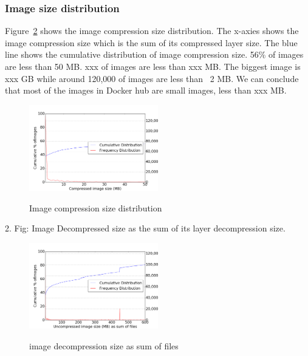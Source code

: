 \subsubsection{Image size distribution}

Figure~\ref{fig_image_size_compression} shows the image compression size distribution. The x-axies shows the image compression size which is the sum of its compressed layer size. The blue line shows the cumulative distribution of image compression size. 56\% of images are less than 50 MB. xxx of images are less than xxx MB. The biggest image is xxx GB while around 120,000 of images are less than ~2 MB. We can conclude that most of the images in Docker hub are small images, less than xxx MB.

\begin{figure}
	\centering
	\includegraphics[width=0.5\textwidth]{graphs/Compressed_image_size_(MB)}\\
	\caption{Image compression size distribution}\label{fig_image_size_compression}
\end{figure}

2. Fig: Image Decompressed size as the sum of its layer decompression size.

\begin{figure}
	\centering
	\includegraphics[width=0.5\textwidth]{graphs/Uncompressed_image_size_(MB)_as_sum_of_files}\\
	\caption{image decompression size as sum of files}\label{fig_image_size_compression}
\end{figure}

